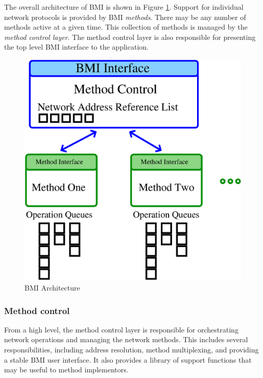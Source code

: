 \documentclass[11pt]{article}
\begin{document}
The overall architecture of BMI is shown in Figure \ref{fig:bmi-arch}.
Support for individual network protocols is provided by BMI
\emph{methods}.  There may be any number of methods active at a given
time.  This collection of methods is managed by the \emph{method control
layer}.  The method control layer is also responsible for presenting the
top level BMI interface to the application.

\begin{figure}
\begin{center}
\includegraphics[scale=0.4]{bmi-arch-color.eps}
\end{center}
\caption{BMI Architecture \label{fig:bmi-arch}}
\end{figure}

\subsubsection{Method control}
\label{method-control-intro}

From a high level, the method control layer is responsible for
orchestrating network operations and managing the network methods.
This includes several responsibilities, including address resolution,
method multiplexing, and providing a stable BMI user interface.  It also
provides a library of support functions that may be useful to method
implementors.
\end{document}
